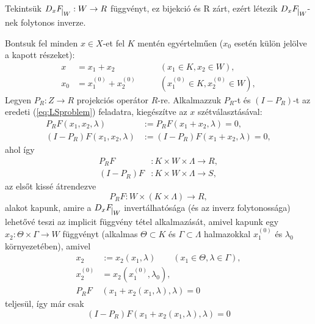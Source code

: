 \documentclass[oneside, titlepage, 12pt, a4paper]{report}
\DeclareMathOperator{\Ker}{Ker}	%
\begin{document}
Tekintsük $D_xF_{\mkern 1mu \vrule height 2ex\mkern2mu W} : W \rightarrow R$ függvényt, ez bijekció és R zárt, ezért létezik $D_xF_{\mkern 1mu \vrule height 2ex\mkern2mu W}$-nek folytonos inverze. \par %
Bontsuk fel minden $x \in X$-et fel $K$ mentén egyértelműen ($x_0$ esetén külön jelölve a kapott részeket):
\begin{align*}
x &= x_1 + x_2 \qquad &(x_1 \in K, x_2 \in W), \\
x_0 &= x_1^{(0)} + x_2^{(0)} \qquad &(x_1^{(0)} \in K, x_2^{(0)} \in W),
\end{align*}
Legyen $P_R : Z \rightarrow R$ projekciós operátor $R$-re. Alkalmazzuk $P_R$-t és $(I - P_R)$-t  az eredeti (\ref{eq:LSproblem}) feladatra, kiegészítve az $x$ szétválasztásával:
\begin{align*}
P_RF(x_1, x_2, \lambda) & := P_RF(x_1 + x_2, \lambda) = 0, \\
(I - P_R)F(x_1, x_2, \lambda) & := (I - P_R)F(x_1 + x_2, \lambda) = 0,
\end{align*}
ahol így
\begin{align*}
P_RF &: K \times W \times \Lambda \rightarrow R, \\
(I - P_R)F &: K \times W \times \Lambda \rightarrow S,
\end{align*}
az elsőt kissé átrendezve
\begin{equation*}
P_RF : W \times (K \times \Lambda) \rightarrow R,
\end{equation*}
alakot kapunk, amire a $D_xF_{\mkern 1mu \vrule height 2ex\mkern2mu W}$ invertálhatósága (és az inverz folytonossága) lehetővé teszi az implicit függvény tétel alkalmazását, amivel kapunk egy $x_2 : \Theta \times \Gamma \rightarrow W$ függvényt (alkalmas $\Theta \subset K$ és $\Gamma \subset \Lambda$ halmazokkal $x_1^{(0)}$ és $\lambda_0$ környezetében), amivel
\begin{align*}
x_2 &:= x_2(x_1, \lambda) \qquad (x_1 \in \Theta, \lambda \in \Gamma), \\
x_2^{(0)} &= x_2(x_1^{(0)}, \lambda_0), \\
P_RF&(x_1 + x_2(x_1, \lambda), \lambda) = 0
\end{align*}
teljesül, így már csak
\begin{equation}
(I - P_R)F(x_1 + x_2(x_1, \lambda), \lambda) = 0
\end{equation}
\end{document}
